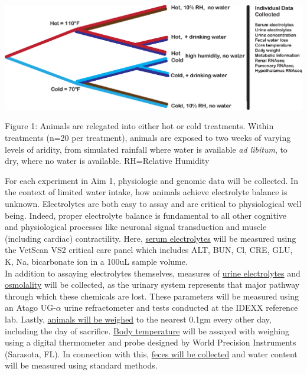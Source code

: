 \documentclass[12pt]{article}
\begin{document}
\vspace{2mm}

\begin{mdframed}
 \begin{center}
  \includegraphics[width=1\textwidth]{exp_design_fig.eps}
 \end{center} 

\noindent \small{Figure 1: Animals are relegated into either hot or cold treatments. Within treatments (n=20 per treatment), animals are exposed to two weeks of varying levels of aridity, from simulated rainfall where water is available \textit{ad libitum}, to dry, where no water is available. RH=Relative Humidity}

\end{mdframed}

\vspace{5mm}


For each experiment in Aim 1, physiologic and genomic data will be collected. In the context of limited water intake, how animals achieve electrolyte balance is unknown. Electrolytes are both easy to assay and are critical to physiological well being. Indeed, proper electrolyte balance is fundamental to all other cognitive and physiological processes like neuronal signal transduction and muscle (including cardiac) contractility. Here, \ul{serum electrolytes} will be measured using the VetScan VS2 critical care panel which includes ALT, BUN, Cl, CRE, GLU, K, Na, bicarbonate ion in a 100uL sample volume. \\

In addition to assaying electrolytes themselves, measures of \ul{urine electrolytes} and \ul{osmolality} will be collected, as the urinary system represents that major pathway through which these chemicals are lost. These parameters will be measured using an Atago UG-$\alpha$ urine refractometer and tests conducted at the IDEXX reference lab. Lastly, \ul{animals will be weighed} to the nearest 0.1gm every other day, including the day of sacrifice. \ul{Body temperature} will be assayed with weighing using a digital thermometer and probe designed by World Precision Instruments (Sarasota, FL). In connection with this, \ul{feces will be collected} and water content will be measured using standard methods. \\
\end{document}
